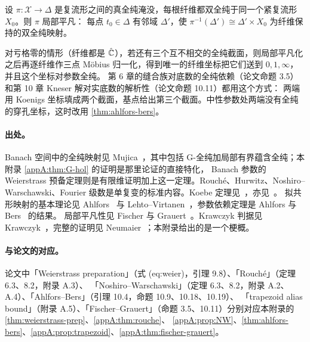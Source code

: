 \begin{theorem}\label{appA:thm:fischer-grauert}
设 $\pi:\mathcal X\to\Delta$ 是复流形之间的真全纯淹没，每根纤维都双全纯于同一个紧复流形 $X_0$。则 $\pi$ 局部平凡：
每点 $t_0\in\Delta$ 有邻域 $\Delta'$，使 $\pi^{-1}(\Delta')\cong\Delta'\times X_0$ 为纤维保持的双全纯映射。
\end{theorem}

对亏格零的情形（纤维都是 $\hat{\mathbb{C}}$），若还有三个互不相交的全纯截面，则局部平凡化之后再逐纤维作三点 Möbius 归一化，得到唯一的纤维坐标把它们送到 $0,1,\infty$，并且这个坐标对参数全纯。
第 6 章的缝合族对底数的全纯依赖（论文命题 3.5）和第 10 章 Kneser 解对实底数的解析性（论文命题 10.11）都用这个方式：
两端用 Koenigs 坐标填成两个截面，基点给出第三个截面。中性参数处两端没有全纯的穿孔坐标，这时改用 \cref{thm:ahlfors-bers}。

\notes

\paragraph{出处。}Banach 空间中的全纯映射见 Mujica~\cite{Mujica1986}，其中包括 G-全纯加局部有界蕴含全纯；本附录 \cref{appA:thm:G-hol} 的证明是那里论证的直接特化，
Banach 参数的 Weierstrass 预备定理则是有限维证明加上这一定理。Rouché、Hurwitz、Noshiro--Warschawski、Fourier 级数是单复变的标准内容。Koebe 定理见~\cite[第~I~章]{CarlesonGamelin1993}，亦见~\cite{Milnor2006}。
拟共形映射的基本理论见 Ahlfors~\cite{AhlforsLectures} 与 Lehto--Virtanen~\cite{LehtoVirtanen}，参数依赖定理是 Ahlfors 与 Bers~\cite{AhlforsBers1960} 的结果。
局部平凡性见 Fischer 与 Grauert~\cite{FischerGrauert1965}。Krawczyk 判据见 Krawczyk~\cite{Krawczyk1969}，完整的证明见 Neumaier~\cite{Neumaier1990}；本附录给出的是一个梗概。

\paragraph{与论文的对应。}论文中「Weierstrass preparation」（式 (eq:weier)，引理 9.8）、「Rouché」（定理 6.3、8.2，附录 A.3）、
「Noshiro--Warschawski」（定理 6.3、8.2，附录 A.2、A.4）、「Ahlfors--Bers」（引理 10.4，命题 10.9、10.18、10.19）、
「trapezoid alias bound」（附录 A.5）、「Fischer--Grauert」（命题 3.5、10.11）分别对应本附录的 \cref{thm:weierstrass-prep}、\cref{appA:thm:rouche}、
\cref{appA:prop:NW}、\cref{thm:ahlfors-bers}、\cref{appA:prop:trapezoid}、\cref{appA:thm:fischer-grauert}。

